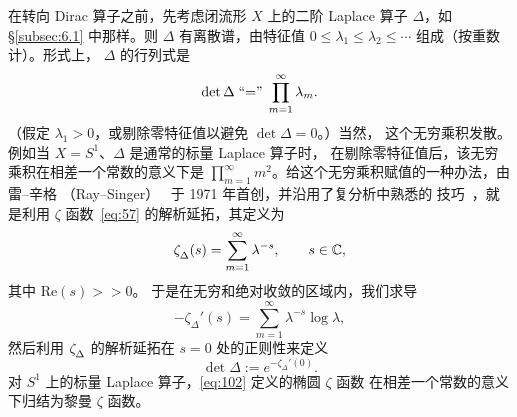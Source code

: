\documentclass[11pt]{amsart}
\theoremstyle{definition}
\theoremstyle{remark}
\theoremstyle{plain}
\numberwithin{equation}{section}
\renewcommand{\:}{\colon}
\newcommand{\CC}{{\mathbb C}}
\newcommand{\cir}{S^1}
\DeclareRobustCommand{\mstrut}{^{\vphantom{1*\prime y\vee M}}}
\newcommand{\zD}{\zeta \mstrut _\Delta }
\renewcommand{\Re}{\text{Re}}
\begin{document}
在转向 Dirac 算子之前，先考虑闭流形 $X$ 上的二阶 Laplace 算子
$\Delta $，如 \S\ref{subsec:6.1} 中那样。则 $\Delta $ 有离散谱，由特征值
$0\le\lambda _1\le\lambda _2\le\cdots$ 组成（按重数计）。形式上，
$\Delta $ 的行列式是
  \begin{equation}\label{eq:101}
     \det\Delta \;\textnormal{``$=$''} \;\prod\limits_{m=1}^{\infty}\lambda _m. 
  \end{equation}
（假定 $\lambda _1>0$，或剔除零特征值以避免 $\det\Delta =0$。）当然，
这个无穷乘积发散。例如当 $X=\cir$、$\Delta $ 是通常的标量 Laplace 算子时，
在剔除零特征值后，该无穷乘积在相差一个常数的意义下是
$\prod_{m=1}^{\infty}m^2$。给这个无穷乘积赋值的一种办法，由雷–辛格
（Ray–Singer）~\cite{RS} 于 1971 年首创，并沿用了复分析中熟悉的
技巧~\cite{JL}，就是利用 $\zeta$ 函数~\eqref{eq:57} 的解析延拓，其定义为
  \begin{equation}\label{eq:102}
     \zD(s) = \sum\limits_{m=1}^{\infty}\lambda ^{-s},\qquad s\in \CC, 
  \end{equation}
其中 $\Re (s)>\!>0$。
于是在无穷和绝对收敛的区域内，我们求导
  \begin{equation}\label{eq:103}
     -\zeta_{\Delta }'(s) = \sum_{m=1}^{\infty}\lambda ^{-s}\log\lambda , 
  \end{equation}
然后利用 $\zD$ 的解析延拓在 $s=0$ 处的正则性来定义
  \begin{equation}\label{eq:104}
     \det\Delta := e^{-\zeta_{\Delta }'(0)} .
  \end{equation}
对 $\cir$ 上的标量 Laplace 算子，\eqref{eq:102} 定义的椭圆 $\zeta$ 函数
在相差一个常数的意义下归结为黎曼 $\zeta$ 函数。
\end{document}
